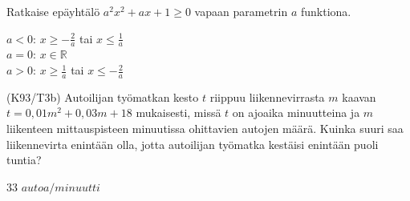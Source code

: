 \begin{tehtava}
    Ratkaise epäyhtälö $a^2x^2+ax+1 \geq 0$ vapaan parametrin $a$ funktiona.
    \begin{vastaus}
        $a < 0$: $x \geq -\frac{2}{a}$ tai $x \leq \frac{1}{a}$ \\ $a = 0$: $x \in \mathbb{R} $ \\ $a > 0$: $x \geq \frac{1}{a}$ tai $x \leq -\frac{2}{a}$
    \end{vastaus}
\end{tehtava}


\begin{tehtava}
(K93/T3b) Autoilijan työmatkan kesto $t$ riippuu liikennevirrasta $m$ kaavan 
        $t=0,01m^2+0,03m+18$ mukaisesti, missä $t$ on ajoaika minuutteina ja $m$ liikenteen mittauspisteen minuutissa ohittavien autojen määrä. Kuinka suuri saa liikennevirta enintään olla, jotta autoilijan työmatka kestäisi enintään puoli tuntia?
\begin{vastaus}
        33 $autoa/minuutti$
    \end{vastaus}
\end{tehtava}
